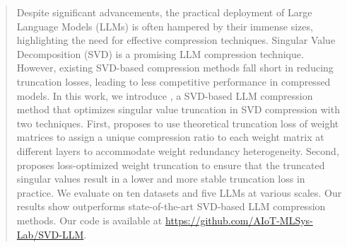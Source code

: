 \begin{abstract}
%
Despite significant advancements, the practical deployment of Large Language Models (LLMs) is often hampered by their immense sizes, highlighting the need for effective compression techniques. 
%
Singular Value Decomposition (SVD) is a promising LLM compression technique. 
%
However, existing SVD-based compression methods fall short in reducing truncation losses, leading to less competitive performance in compressed models. 
%
In this work, we introduce \sysname, a SVD-based LLM compression method that optimizes singular value truncation in SVD compression with two techniques.
%
First, \sysname proposes to use theoretical truncation loss of weight matrices to assign a unique compression ratio to each weight matrix at different layers to accommodate weight redundancy heterogeneity.
%
Second, \sysname proposes loss-optimized weight truncation to ensure that the truncated singular values result in a lower and more stable truncation loss in practice. 
%
We evaluate \sysname on ten datasets and five LLMs at various scales. 
%
Our results show \sysname outperforms state-of-the-art SVD-based LLM compression methods. 
%
Our code is available at \url{https://github.com/AIoT-MLSys-Lab/SVD-LLM}.
\end{abstract}